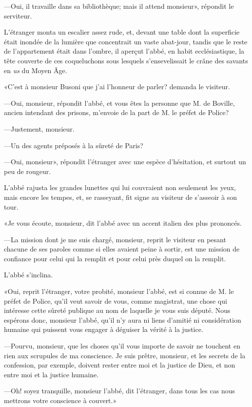 —Oui, il travaille dans sa bibliothèque; mais il attend monsieur», répondit le serviteur. 

L'étranger monta un escalier assez rude, et, devant une table dont la superficie était inondée de la lumière que concentrait un vaste abat-jour, tandis que le reste de l'appartement était dans l'ombre, il aperçut l'abbé, en habit ecclésiastique, la tête couverte de ces coqueluchons sous lesquels s'ensevelissait le crâne des savants en \textit{us} du Moyen Âge. 

«C'est à monsieur Busoni que j'ai l'honneur de parler? demanda le visiteur. 

—Oui, monsieur, répondit l'abbé, et vous êtes la personne que M. de Boville, ancien intendant des prisons, m'envoie de la part de M. le préfet de Police? 

—Justement, monsieur. 

—Un des agents préposés à la sûreté de Paris? 

—Oui, monsieur», répondit l'étranger avec une espèce d'hésitation, et surtout un peu de rougeur. 

L'abbé rajusta les grandes lunettes qui lui couvraient non seulement les yeux, mais encore les tempes, et, se rasseyant, fit signe au visiteur de s'asseoir à son tour. 

«Je vous écoute, monsieur, dit l'abbé avec un accent italien des plus prononcés. 

—La mission dont je me suis chargé, monsieur, reprit le visiteur en pesant chacune de ses paroles comme si elles avaient peine à sortir, est une mission de confiance pour celui qui la remplit et pour celui près duquel on la remplit. 

L'abbé s'inclina. 

«Oui, reprit l'étranger, votre probité, monsieur l'abbé, est si connue de M. le préfet de Police, qu'il veut savoir de vous, comme magistrat, une chose qui intéresse cette sûreté publique au nom de laquelle je vous suis député. Nous espérons donc, monsieur l'abbé, qu'il n'y aura ni liens d'amitié ni considération humaine qui puissent vous engager à déguiser la vérité à la justice. 

—Pourvu, monsieur, que les choses qu'il vous importe de savoir ne touchent en rien aux scrupules de ma conscience. Je suis prêtre, monsieur, et les secrets de la confession, par exemple, doivent rester entre moi et la justice de Dieu, et non entre moi et la justice humaine. 

—Oh! soyez tranquille, monsieur l'abbé, dit l'étranger, dans tous les cas nous mettrons votre conscience à couvert.» 

